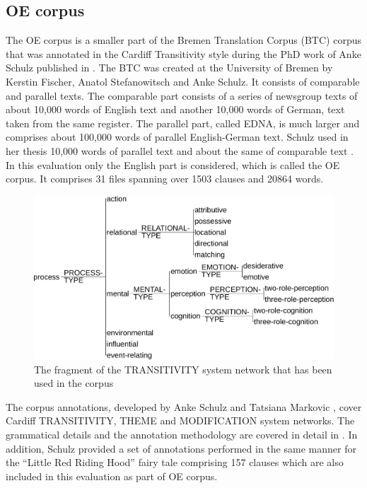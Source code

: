 \subsection{OE corpus}

    The OE corpus is a smaller part of the Bremen Translation Corpus (BTC) corpus that was annotated in the Cardiff Transitivity style during the PhD work of Anke Schulz published in \citeyear{schulz2015me}. The BTC was created at the University of Bremen by Kerstin Fischer, Anatol Stefanowitsch and Anke Schulz. It consists of comparable and parallel texts. The comparable part consists of a series of newsgroup texts of about 10,000 words of English text and another 10,000 words of German, text taken from the same register. The parallel part, called EDNA, is much larger and comprises about 100,000 words of parallel English-German text. Schulz used in her thesis 10,000 words of parallel text and about the same of comparable text \citep[31]{schulz2015me}. In this evaluation only the English part is considered, which is called the OE corpus. It comprises 31 files spanning over 1503 clauses and 20864 words. 
    
    \begin{figure}[!h]
        \centering
        \includegraphics[width=.75\textwidth]{Figures/Evaluation/trans-simplified.pdf}
        \caption{The fragment of the TRANSITIVITY system network that has been used in the corpus}
        \label{fig:transitivity-simplified}
    \end{figure}

    The corpus annotations, developed by Anke Schulz and Tatsiana Markovic \citep[36]{schulz2015me}, cover Cardiff TRANSITIVITY, THEME and MODIFICATION system networks. The grammatical details and the annotation methodology are covered in detail in \citet[48-161]{schulz2015me}. In addition, Schulz provided a set of annotations performed in the same manner for the ``Little Red Riding Hood'' fairy tale comprising 157 clauses which are also included in this evaluation as part of OE corpus.
    
